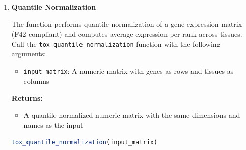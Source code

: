 \begin{enumerate}
\begin{enumerate}
                  The function normalizes each gene's expression vector using \texttt{sqrt(mean(x\textasciicircum
                    2))} across tissues (not classical standard deviation). Call the \texttt{tox\_normalize\_by\_std\_dev}
                  function with the following arguments:
                  
                  \begin{itemize}
                    \item \texttt{input\_matrix}: A numeric matrix with genes as rows and
                          tissues as columns
                  \end{itemize}
                  
                  \textbf{Returns:}
                  \begin{itemize}
                    \item A normalized numeric matrix with the same dimensions and names
                          as the input
                  \end{itemize}
                  \begin{lstlisting}[language=R, caption={R Standard Deviation Normalization}]
tox_normalize_by_std_dev(input_matrix)
                  \end{lstlisting}
                  
            \item \textbf{Quantile Normalization}
                  
                  The function performs quantile normalization of a gene expression matrix
                  (F42-compliant) and computes average expression per rank across tissues.
                  Call the \texttt{tox\_quantile\_normalization} function with the following
                  arguments:
                  
                  \begin{itemize}
                    \item \texttt{input\_matrix}: A numeric matrix with genes as rows and
                          tissues as columns
                  \end{itemize}
                  
                  \textbf{Returns:}
                  \begin{itemize}
                    \item A quantile-normalized numeric matrix with the same dimensions and
                          names as the input
                  \end{itemize}
                  \begin{lstlisting}[language=R, caption={R Quantile Normalization}]
tox_quantile_normalization(input_matrix)
                  \end{lstlisting}
                  

\end{enumerate}
\end{enumerate}
